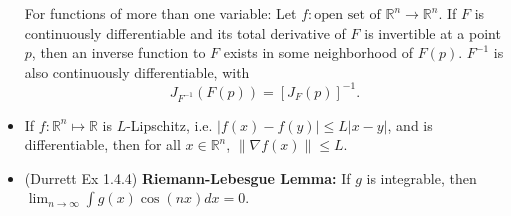 \documentclass[twoside]{article}
\newcommand{\dis}{\displaystyle}
\newcommand\bbR{\mathbb{R}}
\newcommand\goesto{\rightarrow}
\begin{document}
\begin{itemize}
For functions of more than one variable: Let $f: \text{open set of } \bbR^n \goesto \bbR^n$. If $F$ is continuously differentiable and its total derivative of $F$ is invertible at a point $p$, then an inverse function to $F$ exists in some neighborhood of $F(p)$. $F^{-1}$ is also continuously differentiable, with
\begin{equation*}
J_{F^{-1}}(F(p)) = [J_F(p)]^{-1}.
\end{equation*}

\item If $f: \bbR^n \mapsto \bbR$ is $L$-Lipschitz, i.e. $|f(x) - f(y)| \leq L |x-y|$, and is differentiable, then for all $x \in \bbR^n$, $\| \nabla f(x) \| \leq L$.

\item (Durrett Ex 1.4.4) \textbf{Riemann-Lebesgue Lemma:} If $g$ is integrable, then $\dis\lim_{n \goesto \infty}\int g(x) \cos (nx) dx = 0$.

\end{itemize}
\end{document}
